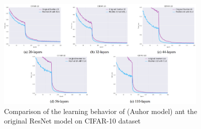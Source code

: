 \documentclass[12pt]{article}
\numberwithin{equation}{section}
\numberwithin{table}{section}
\numberwithin{figure}{section}
\begin{document}
\begin{figure} \centering
	\includegraphics[width=0.9\textwidth]{image4.png}
	\caption{Comparison of the learning behavior of (Auhor model) ant the original ResNet model on CIFAR-10 dataset}
	\label{figure4}
\end{figure}


%
\end{document}

